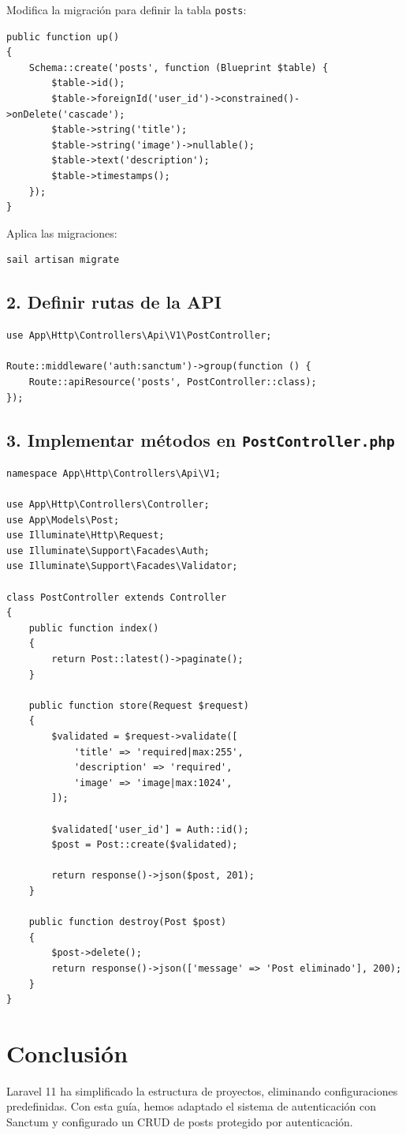 \documentclass[11pt]{article}
\begin{document}
Modifica la migración para definir la tabla \texttt{posts}:

\begin{verbatim}
public function up()
{
    Schema::create('posts', function (Blueprint $table) {
        $table->id();
        $table->foreignId('user_id')->constrained()->onDelete('cascade');
        $table->string('title');
        $table->string('image')->nullable();
        $table->text('description');
        $table->timestamps();
    });
}
\end{verbatim}

Aplica las migraciones:

\begin{verbatim}
sail artisan migrate
\end{verbatim}

\subsection{2. Definir rutas de la API}
\label{sec:org05bbb41}

\begin{verbatim}
use App\Http\Controllers\Api\V1\PostController;

Route::middleware('auth:sanctum')->group(function () {
    Route::apiResource('posts', PostController::class);
});
\end{verbatim}

\subsection{3. Implementar métodos en \texttt{PostController.php}}
\label{sec:orga0c3666}

\begin{verbatim}
namespace App\Http\Controllers\Api\V1;

use App\Http\Controllers\Controller;
use App\Models\Post;
use Illuminate\Http\Request;
use Illuminate\Support\Facades\Auth;
use Illuminate\Support\Facades\Validator;

class PostController extends Controller
{
    public function index()
    {
        return Post::latest()->paginate();
    }

    public function store(Request $request)
    {
        $validated = $request->validate([
            'title' => 'required|max:255',
            'description' => 'required',
            'image' => 'image|max:1024',
        ]);

        $validated['user_id'] = Auth::id();
        $post = Post::create($validated);

        return response()->json($post, 201);
    }

    public function destroy(Post $post)
    {
        $post->delete();
        return response()->json(['message' => 'Post eliminado'], 200);
    }
}
\end{verbatim}

\section{Conclusión}
\label{sec:org6d0b0cc}

Laravel 11 ha simplificado la estructura de proyectos, eliminando
configuraciones predefinidas. Con esta guía, hemos adaptado el sistema
de autenticación con Sanctum y configurado un CRUD de posts protegido
por autenticación. 🚀
\end{document}

